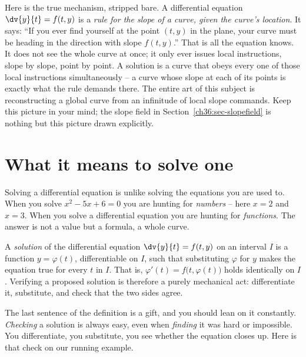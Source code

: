\begin{happeningbox}
Here is the true mechanism, stripped bare. A differential equation $\dv{y}{t} = f(t,y)$ is a \emph{rule for the slope of a curve, given the curve's location}. It says: ``If you ever find yourself at the point $(t,y)$ in the plane, your curve must be heading in the direction with slope $f(t,y)$.'' That is all the equation knows. It does not see the whole curve at once; it only ever issues local instructions, slope by slope, point by point. A solution is a curve that obeys every one of those local instructions simultaneously -- a curve whose slope at each of its points is exactly what the rule demands there. The entire art of this subject is reconstructing a global curve from an infinitude of local slope commands. Keep this picture in your mind; the slope field in Section~\ref{ch36:sec-slopefield} is nothing but this picture drawn explicitly.
\end{happeningbox}

\section{What it means to solve one}
\label{ch36:sec-solve}

Solving a differential equation is unlike solving the equations you are used to. When you solve $x^2 - 5x + 6 = 0$ you are hunting for \emph{numbers} -- here $x=2$ and $x=3$. When you solve a differential equation you are hunting for \emph{functions}. The answer is not a value but a formula, a whole curve.

\begin{definition}
\label{ch36:def-solution}
A \emph{solution} of the differential equation $\dv{y}{t} = f(t,y)$ on an interval $I$ is a function $y = \varphi(t)$, differentiable on $I$, such that substituting $\varphi$ for $y$ makes the equation true for every $t$ in $I$. That is, $\varphi'(t) = f\big(t, \varphi(t)\big)$ holds identically on $I$. Verifying a proposed solution is therefore a purely mechanical act: differentiate it, substitute, and check that the two sides agree.
\end{definition}

The last sentence of the definition is a gift, and you should lean on it constantly. \emph{Checking} a solution is always easy, even when \emph{finding} it was hard or impossible. You differentiate, you substitute, you see whether the equation closes up. Here is that check on our running example.

